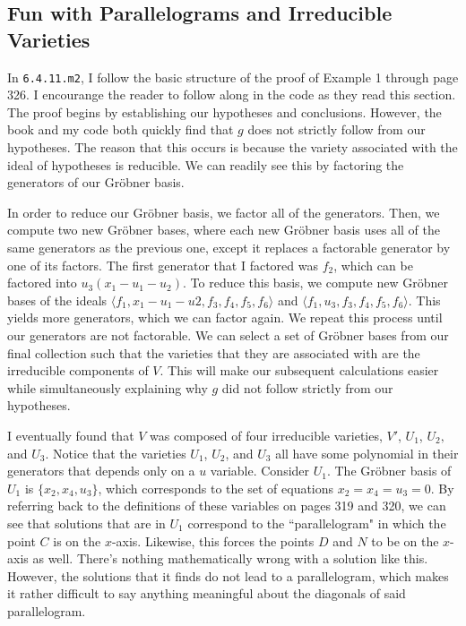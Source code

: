 \documentclass[12pt]{article}
\theoremstyle{plain}
\theoremstyle{definition}
\theoremstyle{remark}
\newcommand{\gro}{Gr\"obner }
\begin{document}
\subsection{Fun with Parallelograms and Irreducible Varieties}
In \texttt{6.4.11.m2}, I follow the basic structure of the proof of Example 1 through page 326. I encourange the reader to follow along in the code as they read this section.
The proof begins by establishing our hypotheses and conclusions.
However, the book and my code both quickly find that $g$ does not strictly follow from our hypotheses.
The reason that this occurs is because the variety associated with the ideal of hypotheses is reducible.
We can readily see this by factoring the generators of our \gro basis. 

In order to reduce our \gro basis, we factor all of the generators. 
Then, we compute two new \gro bases, where each new \gro basis uses all of the same generators as the previous one, except it replaces a factorable generator by one of its factors.
The first generator that I factored was $f_2$, which can be factored into $u_3(x_1 - u_1 - u_2)$.
To reduce this basis, we compute new \gro bases of the ideals $\langle f_1, x_1 - u_1 - u2, f_3, f_4, f_5, f_6 \rangle$ and $\langle f_1, u_3, f_3, f_4, f_5, f_6 \rangle$.
This yields more generators, which we can factor again. We repeat this process until our generators are not factorable. 
We can select a set of \gro bases from our final collection such that the varieties that they are associated with are the irreducible components of $V$.
This will make our subsequent calculations easier while simultaneously explaining why $g$ did not follow strictly from our hypotheses.

I eventually found that $V$ was composed of four irreducible varieties, $V'$, $U_1$, $U_2,$ and $U_3$.
Notice that the varieties $U_1$, $U_2$, and $U_3$ all have some polynomial in their generators that depends only on a $u$ variable.
Consider $U_1$. The \gro basis of $U_1$ is $\{ x_2, x_4, u_3\}$, which corresponds to the set of equations $x_2 = x_4 = u_3 = 0$. 
By referring back to the definitions of these variables on pages 319 and 320, we can see that solutions that are in $U_1$ correspond to the ``parallelogram" in which the point $C$ is on the $x$-axis.
Likewise, this forces the points $D$ and $N$ to be on the $x$-axis as well.
There's nothing mathematically wrong with a solution like this. 
However, the solutions that it finds do not lead to a parallelogram, which makes it rather difficult to say anything meaningful about the diagonals of said parallelogram.
\end{document}
